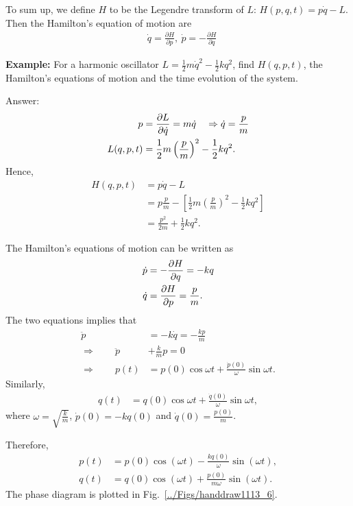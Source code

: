 To sum up, we define $H$ to be the Legendre transform
of $L$: $H(p,q,t)=p\dot{q}-L$. Then the Hamilton's equation of motion
are
\begin{align}
 & \boxed{\dot{q}=\frac{\partial H}{\partial p},\ \dot{p}=-\frac{\partial H}{\partial q}}
\end{align}

\textbf{Example:}
For a harmonic oscillator $ L=\frac{1}{2} m\dot{q}^2-\frac{1}{2} kq^2 $, find $ H(q,p,t) $, the Hamilton's equations of motion and the time evolution of the system. 

Answer: 
\begin{align}
p &= \frac{\partial {L}}{\partial {\dot{q}}}=m\dot{q} \quad \Rightarrow \dot{q} =\frac{p}{m}\\
L(q,p,t) &= \frac{1}{2} m \left( \frac{p}{m} \right)^2 -\frac{1}{2} kq^2.
\end{align}
Hence, 
\begin{align}
H(q,p,t) &= p\dot{q}-L \\
&= p\frac{p}{m} - \left[\frac{1}{2} m \left( \frac{p}{m} \right)^2 -\frac{1}{2} kq^2 \right]\\
&= \frac{p^2}{2m} + \frac{1}{2} kq^2.
\end{align}

The Hamilton's equations of motion can be written as
\begin{align}
\dot{p} &= -\frac{\partial {H}}{\partial {q}}=-kq\\
\dot{q} &= \frac{\partial {H}}{\partial {p}} = \frac{p}{m}.
\end{align}
The two equations implies that
\begin{align}
\ddot{p} &= -k\dot{q} = -\frac{kp}{m}\\
\Rightarrow \qquad \ddot{p} &+ \frac{k}{m} p=0\\
\Rightarrow \qquad p(t) &= p(0)\cos \omega t + \frac{\dot{p}(0)}{\omega} \sin \omega t.
\end{align}
Similarly, 
\begin{align}
q(t) &= q(0) \cos \omega t + \frac{\dot{q}(0)}{\omega}\sin \omega t,
\end{align}
where $ \omega = \sqrt{\frac{k}{m}} $, $ \dot{p}(0) =-kq(0)$ and $ \dot{q}(0)= \frac{p(0)}{m} $. 

Therefore, 
\begin{align}
 p(t) & =p(0)\cos(\omega t)-\frac{kq(0)}{\omega}\sin(\omega t),\\
q(t) & =q(0)\cos(\omega t)+\frac{p(0)}{m\omega}\sin(\omega t).
\end{align}
The phase diagram is plotted in Fig.~\ref{../Figs/handdraw1113_6}.

